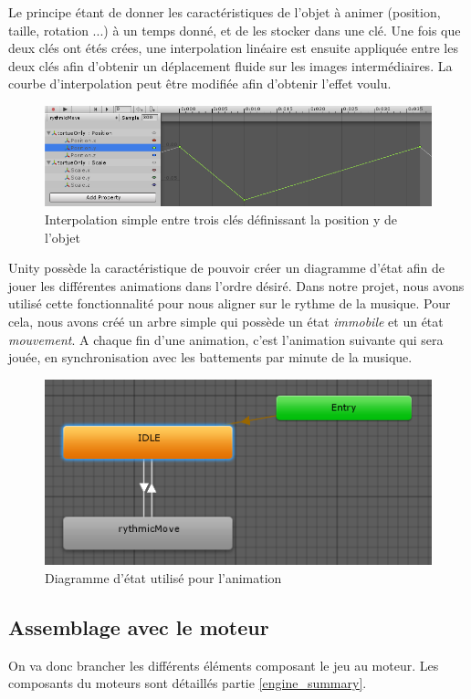 Le principe étant de donner les caractéristiques de l'objet à animer (position, taille, rotation ...) à un temps donné, et de les stocker dans une clé. Une fois que deux clés ont étés crées, une interpolation linéaire est ensuite appliquée entre les deux clés afin d'obtenir un déplacement fluide sur les images intermédiaires. La courbe d'interpolation peut être modifiée afin d'obtenir l'effet voulu.

\begin{figure}[H]\centering
  \includegraphics[scale=.55]{./img/technique_animation2.png}
  \caption{Interpolation simple entre trois clés définissant la position y de l'objet}
  \label{technique_animation2}
\end{figure}

Unity possède la caractéristique de pouvoir créer un diagramme d'état afin de jouer les différentes animations dans l'ordre désiré. Dans notre projet, nous avons utilisé cette fonctionnalité pour nous aligner sur le rythme de la musique. Pour cela, nous avons créé un arbre simple qui possède un état \textit{immobile} et un état \textit{mouvement}. A chaque fin d'une animation, c'est l'animation suivante qui sera jouée, en synchronisation avec les battements par minute de la musique.

\begin{figure}[H]\centering
  \includegraphics[scale=.55]{./img/technique_animation3.png}
  \caption{Diagramme d'état utilisé pour l'animation}
  \label{technique_animation3}
\end{figure}

\subsection{Assemblage avec le moteur}
On va donc brancher les différents éléments composant le jeu au moteur. Les composants du moteurs sont détaillés partie \ref{engine_summary}. 
